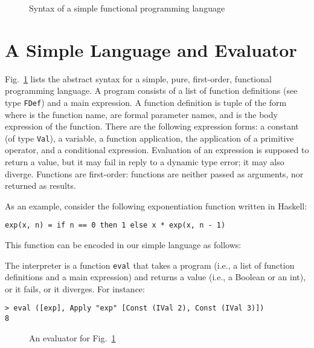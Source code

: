 \documentclass{eptcs}
\begin{document}
\begin{figure}
     \caption{Syntax of a simple functional programming language}
\label{F:syntax}
\end{figure}


\section{A Simple Language and Evaluator}

Fig.~\ref{F:syntax} lists the abstract syntax for a simple, pure,
first-order, functional programming language. A program consists of a list of function definitions (see type
\lstinline{FDef}) and a main expression. A function definition is
tuple of the form  where  is the function
name,  are formal parameter names, and  is the body expression
of the function. There are the following expression forms: a constant
(of type \lstinline{Val}), a variable, a function application, the
application of a primitive operator, and a conditional
expression. Evaluation of an expression is supposed to return a value,
but it may fail in reply to a dynamic type error; it may also diverge.
Functions are first-order: functions are neither passed as arguments,
nor returned as results.

As an example, consider the following exponentiation function written in Haskell:

\begin{lstlisting}
exp(x, n) = if n == 0 then 1 else x * exp(x, n - 1)
\end{lstlisting}

\noindent
This function can be encoded in our simple language as follows:

 

\noindent
The interpreter is a function \lstinline{eval} that takes a 
program (i.e., a list of function definitions and a main expression)
and returns a value (i.e., a Boolean or an int), or it fails, or it
diverges. For instance:

\begin{lstlisting}
> eval ([exp], Apply "exp" [Const (IVal 2), Const (IVal 3)])
8
\end{lstlisting}

\begin{figure}
   \caption{An evaluator for Fig.~\ref{F:syntax}}
\label{F:Eval}
\end{figure}
\end{document}
